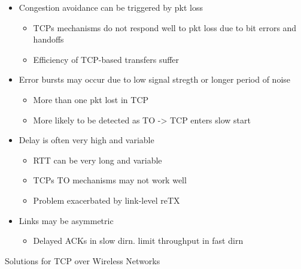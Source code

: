 \documentclass[a4paper]{article}
\begin{document}
\begin{itemize}
	\item Congestion avoidance can be triggered by pkt loss
	\begin{itemize}
		\item TCPs mechanisms do not respond well to pkt loss due to bit
			errors and handoffs
		\item Efficiency of TCP-based transfers suffer
	\end{itemize}
	\item Error bursts may occur due to low signal stregth or longer period
		of noise
	\begin{itemize}
		\item More than one pkt lost in TCP
		\item More likely to be detected as TO -> TCP enters slow start
	\end{itemize}
	\item Delay is often very high and variable
	\begin{itemize}
		\item RTT can be very long and variable
		\item TCPs TO mechanisms may not work well
		\item Problem exacerbated by link-level reTX
	\end{itemize}
	\item Links may be asymmetric
	\begin{itemize}
		\item Delayed ACKs in slow dirn. limit throughput in fast dirn
	\end{itemize}
\end{itemize}
Solutions for TCP over Wireless Networks
\end{document}
